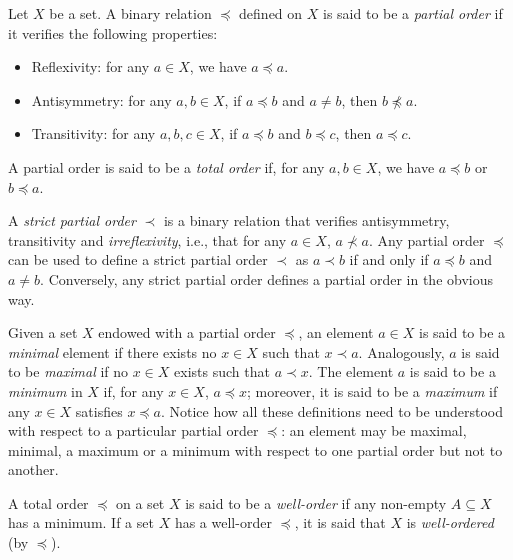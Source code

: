 \begin{definition}
Let $X$ be a set. A binary relation $\preceq$ defined on $X$ is said to be a \emph{partial order} if it verifies the following properties:
\begin{itemize}
\item Reflexivity: for any $a\in X$, we have $a\preceq a$.
\item Antisymmetry: for any $a,b\in X$, if $a\preceq b$ and $a\neq b$, then $b\not\preceq a$.
\item Transitivity: for any $a,b,c\in X$, if $a\preceq b$ and $b\preceq c$, then $a\preceq c$.
\end{itemize}
A partial order is said to be a \emph{total order} if, for any $a,b\in X$, we have $a\preceq b$ or $b\preceq a$.

A \emph{strict partial order} $\prec$ is a binary relation that verifies antisymmetry, transitivity and \emph{irreflexivity}, i.e., that for any $a\in X$, $a\not\prec a$. 
Any partial order $\preceq$ can be used to define a strict partial order $\prec$ as $a \prec b$ if and only if $a\preceq b$ and $a\neq b$.
Conversely, any strict partial order defines a partial order in the obvious way.

Given a set $X$ endowed with a partial order $\preceq$, an element $a\in X$ is said to be a \emph{minimal} element if there exists no $x\in X$ such that $x\prec a$.
Analogously, $a$ is said to be \emph{maximal} if no $x\in X$ exists such that $a\prec x$.
The element $a$ is said to be a \emph{minimum} in $X$ if, for any $x\in X$, $a\preceq x$; moreover, it is said to be a \emph{maximum} if any $x\in X$ satisfies $x\preceq a$.
Notice how all these definitions need to be understood with respect to a particular partial order $\preceq$: an element may be maximal, minimal, a maximum or a minimum with respect to one partial order but not to another.

A total order $\preceq$ on a set $X$ is said to be a \emph{well-order} if any non-empty $A\subseteq X$ has a minimum. If a set $X$ has a well-order $\preceq$, it is said that $X$ is \emph{well-ordered} (by $\preceq$).
\label{<+label+>}
\end{definition}


